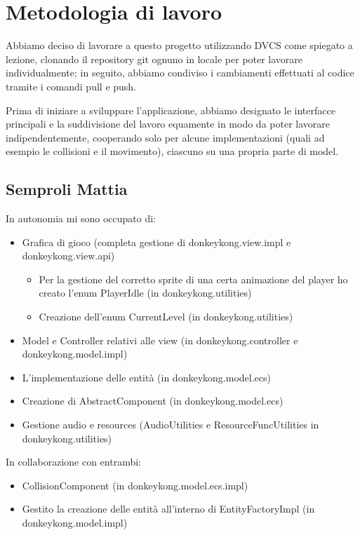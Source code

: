 \documentclass[a4paper,12pt]{report}
\begin{document}
\section{Metodologia di lavoro}
Abbiamo deciso di lavorare a questo progetto utilizzando DVCS come spiegato a lezione, clonando il repository git ognuno in locale per poter lavorare individualmente; in seguito, abbiamo condiviso i cambiamenti effettuati al codice tramite i comandi pull e push.

Prima di iniziare a sviluppare l'applicazione, abbiamo designato le interfacce principali e la suddivisione del lavoro equamente in modo da poter lavorare indipendentemente, cooperando solo per alcune implementazioni (quali ad esempio le collisioni e il movimento), ciascuno su una propria parte di model.

\subsection*{Semproli Mattia}

In autonomia mi sono occupato di:
\begin{itemize}
    \item Grafica di gioco (completa gestione di donkeykong.view.impl e donkeykong.view.api) 
    \begin{itemize}
        \item Per la gestione del corretto sprite di una certa animazione del player ho creato l’enum PlayerIdle (in donkeykong.utilities)
        \item Creazione dell’enum CurrentLevel (in donkeykong.utilities)
    \end{itemize}
    \item Model e Controller relativi alle view (in donkeykong.controller e donkeykong.model.impl)
    \item L’implementazione delle entità (in donkeykong.model.ecs)
    \item Creazione di AbstractComponent (in donkeykong.model.ecs)
    \item Gestione audio e resources (AudioUtilities e ResourceFuncUtilities in donkeykong.utilities)
\end{itemize}

In collaborazione con entrambi:
\begin{itemize}
    \item CollisionComponent (in donkeykong.model.ecs.impl)
    \item Gestito la creazione delle entità all’interno di EntityFactoryImpl (in donkeykong.model.impl)
\end{itemize}
\end{document}
